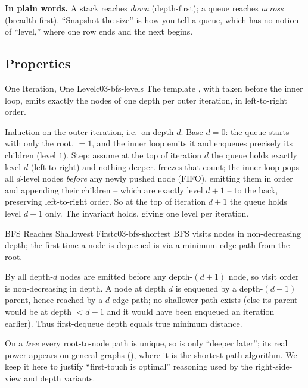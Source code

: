 \noindent\textbf{In plain words.} A stack reaches \emph{down} (depth-first); a queue reaches
\emph{across} (breadth-first). ``Snapshot the size'' is how you tell a queue, which has no
notion of ``level,'' where one row ends and the next begins.

\subsection{Properties}

\begin{theorem}{One Iteration, One Level}{c03-bfs-levels}
The template , with  taken before the inner loop,
emits exactly the nodes of one depth per outer iteration, in left-to-right order.
\end{theorem}
\begin{proofbox}
Induction on the outer iteration, i.e.\ on depth $d$. Base $d=0$: the queue starts with
only the root, $=1$, and the inner loop emits it and enqueues precisely its
children (level $1$). Step: assume at the top of iteration $d$ the queue holds exactly
level $d$ (left-to-right) and nothing deeper.  freezes that count; the inner loop
pops all $d$-level nodes \emph{before} any newly pushed node (FIFO), emitting them in order
and appending their children -- which are exactly level $d{+}1$ -- to the back, preserving
left-to-right order. So at the top of iteration $d{+}1$ the queue holds level $d{+}1$
only. The invariant holds, giving one level per iteration.
\end{proofbox}

\begin{theorem}{BFS Reaches Shallowest First}{c03-bfs-shortest}
BFS visits nodes in non-decreasing depth; the first time a node is dequeued is via a
minimum-edge path from the root.
\end{theorem}
\begin{proofbox}
By  all depth-$d$ nodes are emitted before any depth-$(d{+}1)$
node, so visit order is non-decreasing in depth. A node at depth $d$ is enqueued by a
depth-$(d{-}1)$ parent, hence reached by a $d$-edge path; no shallower path exists (else
its parent would be at depth $<d{-}1$ and it would have been enqueued an iteration
earlier). Thus first-dequeue depth equals true minimum distance.
\end{proofbox}
\begin{insightbox}
On a \emph{tree} every root-to-node path is unique, so  is only
``deeper later''; its real power appears on general graphs (), where it is the
shortest-path algorithm. We keep it here to justify ``first-touch is optimal'' reasoning
used by the right-side-view and depth variants.
\end{insightbox}


